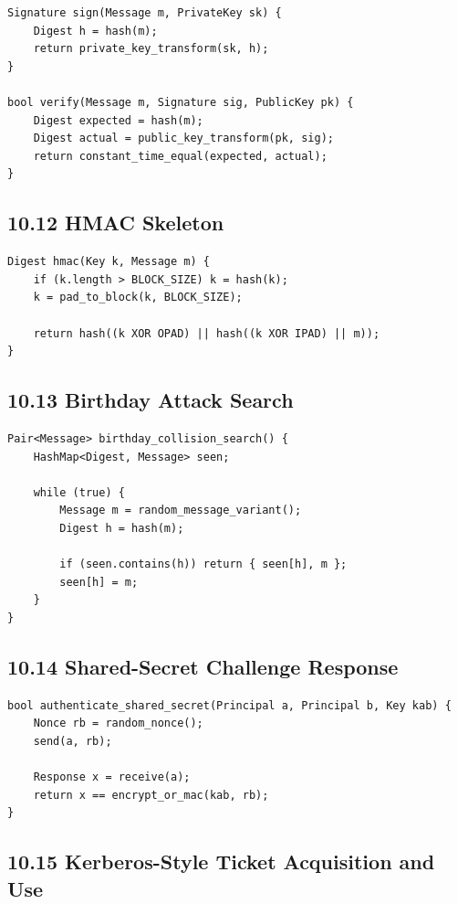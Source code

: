 \documentclass[11pt]{article}
\begin{document}
\begin{verbatim}
Signature sign(Message m, PrivateKey sk) {
    Digest h = hash(m);
    return private_key_transform(sk, h);
}

bool verify(Message m, Signature sig, PublicKey pk) {
    Digest expected = hash(m);
    Digest actual = public_key_transform(pk, sig);
    return constant_time_equal(expected, actual);
}
\end{verbatim}

\subsection{10.12 HMAC Skeleton}\label{hmac-skeleton}

\begin{verbatim}
Digest hmac(Key k, Message m) {
    if (k.length > BLOCK_SIZE) k = hash(k);
    k = pad_to_block(k, BLOCK_SIZE);

    return hash((k XOR OPAD) || hash((k XOR IPAD) || m));
}
\end{verbatim}

\subsection{10.13 Birthday Attack Search}\label{birthday-attack-search}

\begin{verbatim}
Pair<Message> birthday_collision_search() {
    HashMap<Digest, Message> seen;

    while (true) {
        Message m = random_message_variant();
        Digest h = hash(m);

        if (seen.contains(h)) return { seen[h], m };
        seen[h] = m;
    }
}
\end{verbatim}

\subsection{10.14 Shared-Secret Challenge
Response}\label{shared-secret-challenge-response}

\begin{verbatim}
bool authenticate_shared_secret(Principal a, Principal b, Key kab) {
    Nonce rb = random_nonce();
    send(a, rb);

    Response x = receive(a);
    return x == encrypt_or_mac(kab, rb);
}
\end{verbatim}

\subsection{10.15 Kerberos-Style Ticket Acquisition and
Use}\label{kerberos-style-ticket-acquisition-and-use}
\end{document}
